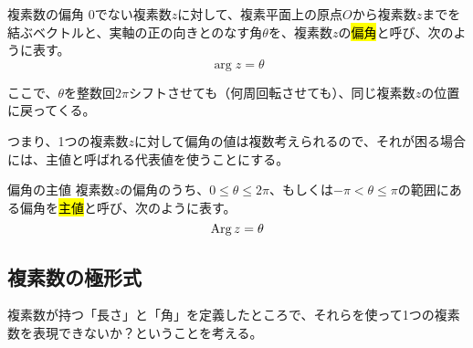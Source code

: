 \documentclass[../math-imaging]{subfiles}
\begin{document}
\begin{definition}{複素数の偏角}
  \newline
  $0$でない複素数$z$に対して、複素平面上の原点$O$から複素数$z$までを結ぶベクトルと、実軸の正の向きとのなす角$\theta$を、複素数$z$の\hl{偏角}と呼び、次のように表す。
  \LARGE
  \begin{equation}
    \arg z = \theta
  \end{equation}
\end{definition}

ここで、$\theta$を整数回$2\pi$シフトさせても（何周回転させても）、同じ複素数$z$の位置に戻ってくる。

つまり、1つの複素数$z$に対して偏角の値は複数考えられるので、それが困る場合には、主値と呼ばれる代表値を使うことにする。

\begin{definition}{偏角の主値}
  \newline
  複素数$z$の偏角のうち、$0\leq \theta \leq 2\pi$、もしくは$-\pi < \theta \leq \pi$の範囲にある偏角を\hl{主値}と呼び、次のように表す。
  \LARGE
  \begin{equation}
    \operatorname{Arg} z = \theta
  \end{equation}
\end{definition}

\subsection{複素数の極形式}

複素数が持つ「長さ」と「角」を定義したところで、それらを使って1つの複素数を表現できないか？ということを考える。
\end{document}
